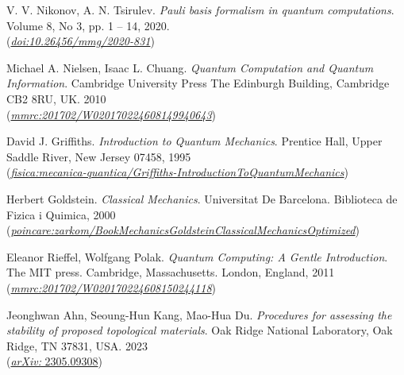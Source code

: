 \documentclass[a4paper]{report}
\begin{document}
\begin{thebibliography}{99}

    V. V. Nikonov, A. N. Tsirulev. \textit{Pauli basis formalism in quantum computations}. Volume 8, No 3, pp. 1 – 14, 2020.\\
    (\href{https:doi.org/10.26456/mmg/2020-831} {\textit{doi:10.26456/mmg/2020-831}})

    Michael A. Nielsen, Isaac L. Chuang. \textit{Quantum Computation and Quantum Information}. Cambridge University Press The Edinburgh Building, Cambridge CB2 8RU, UK. 2010\\
    (\href{http://mmrc.amss.cas.cn/tlb/201702/W020170224608149940643.pdf} {\textit{mmrc:201702/W020170224608149940643}})

    David J. Griffiths. \textit{Introduction to Quantum Mechanics}. Prentice Hall, Upper Saddle River, New Jersey 07458, 1995\\
    (\href{https://www.fisica.net/mecanica-quantica/Griffiths%20-%20Introduction%20to%20quantum%20mechanics.pdf} {\textit{fisica:mecanica-quantica/Griffiths-IntroductionToQuantumMechanics}})

    Herbert Goldstein. \textit{Classical Mechanics}. Universitat De Barcelona. Biblioteca de Fizica i Quimica, 2000\\
    (\href{https://poincare.matf.bg.ac.rs/~zarkom/Book_Mechanics_Goldstein_Classical_Mechanics_optimized.pdf} {\textit{poincare:zarkom/BookMechanicsGoldsteinClassicalMechanicsOptimized}})

    Eleanor Rieffel, Wolfgang Polak. \textit{Quantum Computing: A Gentle Introduction}. The MIT press. Cambridge, Massachusetts. London, England, 2011\\
    (\href{http://mmrc.amss.cas.cn/tlb/201702/W020170224608150244118.pdf} {\textit{mmrc:201702/W020170224608150244118}})

    Jeonghwan Ahn, Seoung-Hun Kang, Mao-Hua Du. \textit{Procedures for assessing the stability of proposed topological materials}. Oak Ridge National Laboratory, Oak Ridge, TN 37831, USA. 2023\\
    (\href{https://arxiv.org/abs/2305.09308}{\textit{arXiv:} 2305.09308})

\end{thebibliography}
\end{document}

